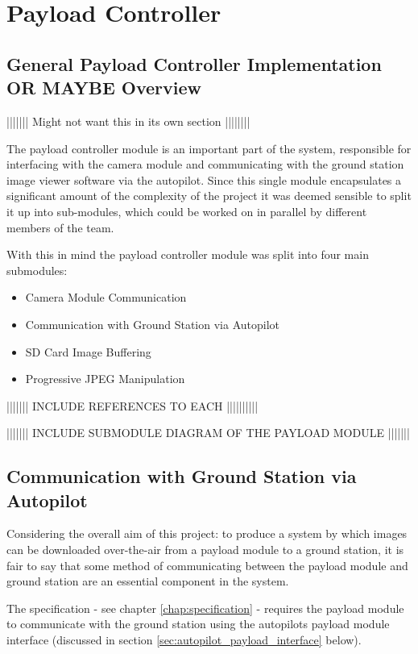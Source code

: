 \section{Payload Controller}
\subsection{General Payload Controller Implementation OR MAYBE Overview}
||||||| Might not want this in its own section ||||||||

The payload controller module is an important part of the system, responsible
for interfacing with the camera module and communicating with the ground 
station image viewer software via the autopilot. Since this single module 
encapsulates a significant amount of the complexity of the project it was 
deemed sensible to split it up into sub-modules, which could be worked on in
parallel by different members of the team. 

With this in mind the payload controller module was split into four main 
submodules:

\begin{itemize}
	\item Camera Module Communication
	\item Communication with Ground Station via Autopilot
	\item SD Card Image Buffering
	\item Progressive JPEG Manipulation
\end{itemize}

||||||| INCLUDE REFERENCES TO EACH ||||||||||

||||||| INCLUDE SUBMODULE DIAGRAM OF THE PAYLOAD MODULE |||||||


\subsection{Communication with Ground Station via Autopilot}
Considering the overall aim of this project: to produce a system by which 
images can be downloaded over-the-air from a payload module to a ground 
station, it is fair to say that some method of communicating between the
payload module and ground station are an essential component in the system.

The specification - see chapter \ref{chap:specification} - requires the payload
module to communicate with the ground station using the autopilots payload
module interface (discussed in section \ref{sec:autopilot_payload_interface}
below).

